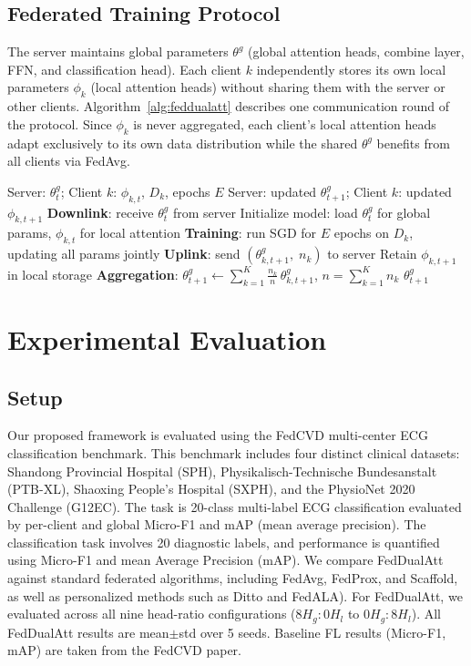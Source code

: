 \documentclass[conference]{IEEEtran}
\begin{document}
{\subsection{Federated Training Protocol}
The server maintains global parameters $\theta^g$ (global attention heads, combine layer, FFN, and classification head). Each client $k$ independently stores its own local parameters $\phi_k$ (local attention heads) without sharing them with the server or other clients.
Algorithm~\ref{alg:feddualatt} describes one communication round of the protocol.
Since $\phi_k$ is never aggregated, each client's local attention heads adapt exclusively to its own data distribution while the shared $\theta^g$ benefits from all clients via FedAvg.
\begin{algorithm}[t]
\caption{FedDualAtt: Communication Round $t$}
\label{alg:feddualatt}
\begin{algorithmic}[1]
\REQUIRE Server: $\theta^g_t$; Client $k$: $\phi_{k,t}$, $D_k$, epochs $E$
\ENSURE Server: updated $\theta^g_{t+1}$; Client $k$: updated $\phi_{k,t+1}$
    \STATE \textbf{Downlink}: receive $\theta^g_t$ from server
    \STATE Initialize model: load $\theta^g_t$ for global params, $\phi_{k,t}$ for local attention
    \STATE \textbf{Training}: run SGD for $E$ epochs on $D_k$, updating all params jointly
    \STATE \textbf{Uplink}: send $(\theta^g_{k,t+1},\; n_k)$ to server
    \STATE Retain $\phi_{k,t+1}$ in local storage
\ENDFOR
\STATE \textbf{Aggregation}: $\theta^g_{t+1} \leftarrow \sum_{k=1}^K \frac{n_k}{n}\,\theta^g_{k,t+1}$, \quad $n = \sum_{k=1}^K n_k$
\RETURN $\theta^g_{t+1}$
\end{algorithmic}
\end{algorithm}

\section{Experimental Evaluation}
\label{section IV}

\subsection{Setup}
Our proposed framework is evaluated using the FedCVD multi-center ECG classification benchmark. This benchmark includes four distinct clinical datasets: Shandong Provincial Hospital (SPH), Physikalisch-Technische Bundesanstalt (PTB-XL), Shaoxing People's Hospital (SXPH), and the PhysioNet 2020 Challenge (G12EC). The task is 20-class multi-label ECG classification evaluated by per-client and global Micro-F1 and mAP (mean average precision). The classification task involves 20 diagnostic labels, and performance is quantified using Micro-F1 and mean Average Precision (mAP). We compare FedDualAtt against standard federated algorithms, including FedAvg, FedProx, and Scaffold, as well as personalized methods such as Ditto and FedALA). For FedDualAtt, we evaluated across all nine head-ratio configurations ($8H_g\!:\!0H_l$ to $0H_g\!:\!8H_l$). All FedDualAtt results are mean$\pm$std over 5 seeds.
Baseline FL results (Micro-F1, mAP) are taken from the FedCVD paper.

}
\end{document}
